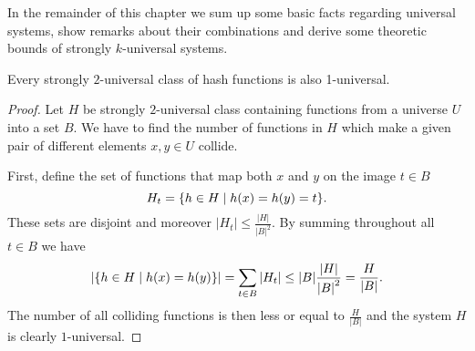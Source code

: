 In the remainder of this chapter we sum up some basic facts regarding universal systems, show remarks about their combinations and derive some theoretic bounds of strongly $k$-universal systems.
\begin{theorem}
Every strongly $2$-universal class of hash functions is also 1-universal.
\end{theorem}
\begin{proof}
Let $H$ be strongly $2$-universal class containing functions from a universe $U$ into a set $B$. We have to find the number of functions in $H$ which make a given pair of different elements $x, y \in U$ collide. 

First, define the set of functions that map both $x$ and $y$ on the image $t \in B$ \[ H_t = \lbrace h \in H \mid h(x) = h(y) = t \rbrace \text{.} \] These sets are disjoint and moreover $|H_t| \leq \frac{|H|}{{|B|}^{2}}$. By summing throughout all $t \in B$ we have
\begin{displaymath}
|\lbrace h \in H \mid h(x) = h(y) \rbrace | = \displaystyle \sum_{t \in B} |H_t| \leq |B| \frac{|H|}{{|B|}^{2}} = \frac{H}{|B|}\text{.}
\end{displaymath}
The number of all colliding functions is then less or equal to $\frac{H}{|B|}$ and the system $H$ is clearly $1$-universal.
\end{proof}

